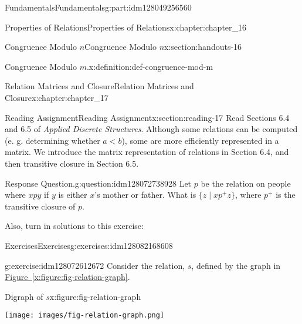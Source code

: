 \documentclass[oneside,10pt,]{book}
\newcommand{\xreffont}{\relax}
\numberwithin{equation}{section}
\newcommand{\lt}{<}
\begin{document}
\begin{partptx}{Fundamentals}{}{Fundamentals}{}{}{g:part:idm128049256560}
\begin{chapterptx}{Properties of Relations}{}{Properties of Relations}{}{}{x:chapter:chapter_16}
\begin{sectionptx}{Congruence Modulo \(n\)}{}{Congruence Modulo \(n\)}{}{}{x:section:handouts-16}
\begin{definition}{Congruence Modulo \(m\).}{x:definition:def-congruence-mod-m}
\begin{equation*}
\end{equation*}
%
\end{definition}
\end{sectionptx}
\end{chapterptx}
%
\typeout{************************************************}
\typeout{************************************************}
%
\begin{chapterptx}{Relation Matrices and Closure}{}{Relation Matrices and Closure}{}{}{x:chapter:chapter_17}
\index{}%
%
%
\typeout{************************************************}
\typeout{************************************************}
%
\begin{sectionptx}{Reading Assignment}{}{Reading Assignment}{}{}{x:section:reading-17}
Read Sections 6.4 and 6.5 of \emph{Applied Discrete Structures}.  Although some relations can be computed (e. g. determining whether \(a \lt b\)), some are more efficiently represented in a matrix.  We introduce the matrix representation of relations in Section 6.4, and then transitive closure in Section 6.5.%
\begin{question}{Response Question.}{g:question:idm128072738928}%
Let \(p\) be the relation on people where \(x p y\) if \(y\) is either \(x\)'s mother or father.   What is \(\{z \mid x p^+ z\}\), where \(p^+\) is the transitive closure of \(p\).%
\end{question}
Also, turn in solutions to this exercise:%
%
%
\typeout{************************************************}
\typeout{************************************************}
%
\begin{exercises-subsection}{Exercises}{}{Exercises}{}{}{g:exercises:idm128082168608}
\par\medskip\noindent%
%
\begin{exercisegroup}
\begin{divisionexerciseeg}{1}{}{}{g:exercise:idm128072612672}%
Consider the relation, \(s\), defined by the graph in \hyperref[x:figure:fig-relation-graph]{Figure~{\xreffont\ref{x:figure:fig-relation-graph}}}.%
\begin{figureptx}{Digraph of \(s\)}{x:figure:fig-relation-graph}{}%
\begin{image}{0.25}{0.5}{0.25}%
\texttt{[image: images/fig-relation-graph.png]}
\end{image}%
\tcblower
\end{figureptx}%
%
\begin{enumerate}[label=(\alph*)]

\end{enumerate}
\end{divisionexerciseeg}
\end{exercisegroup}
\end{exercises-subsection}
\end{sectionptx}
\end{chapterptx}
\end{partptx}
\end{document}
